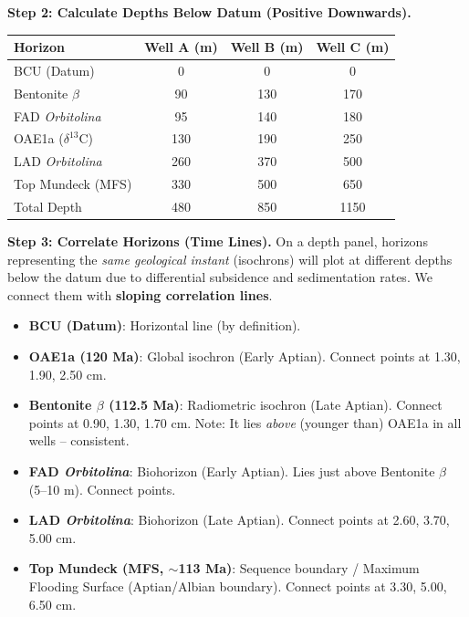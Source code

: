 \documentclass[11pt]{article}
\begin{document}
\begin{exoresolu}
\noindent\textbf{Step 2: Calculate Depths Below Datum (Positive Downwards).}
\begin{center}
\begin{tabular}{|l|ccc|}
\hline
\textbf{Horizon} & \textbf{Well A (m)} & \textbf{Well B (m)} & \textbf{Well C (m)} \\
\hline
BCU (Datum) & 0 & 0 & 0 \\
Bentonite $\beta$ & 90 & 130 & 170 \\
FAD \emph{Orbitolina} & 95 & 140 & 180 \\
OAE1a ($\delta^{13}$C) & 130 & 190 & 250 \\
LAD \emph{Orbitolina} & 260 & 370 & 500 \\
Top Mundeck (MFS) & 330 & 500 & 650 \\
Total Depth & 480 & 850 & 1150 \\
\hline
\end{tabular}
\end{center}

\noindent\textbf{Step 3: Correlate Horizons (Time Lines).}
On a depth panel, horizons representing the \emph{same geological instant} (isochrons) will plot at different depths below the datum due to differential subsidence and sedimentation rates. We connect them with \textbf{sloping correlation lines}.
\begin{itemize}
\item \textbf{BCU (Datum)}: Horizontal line (by definition).
\item \textbf{OAE1a (120 Ma)}: Global isochron (Early Aptian). Connect points at 1.30, 1.90, 2.50 cm.
\item \textbf{Bentonite $\beta$ (112.5 Ma)}: Radiometric isochron (Late Aptian). Connect points at 0.90, 1.30, 1.70 cm. Note: It lies \emph{above} (younger than) OAE1a in all wells -- consistent.
\item \textbf{FAD \emph{Orbitolina}}: Biohorizon (Early Aptian). Lies just above Bentonite $\beta$ (5--10 m). Connect points.
\item \textbf{LAD \emph{Orbitolina}}: Biohorizon (Late Aptian). Connect points at 2.60, 3.70, 5.00 cm.
\item \textbf{Top Mundeck (MFS, $\sim$113 Ma)}: Sequence boundary / Maximum Flooding Surface (Aptian/Albian boundary). Connect points at 3.30, 5.00, 6.50 cm.
\end{itemize}


\end{exoresolu}
\end{document}
